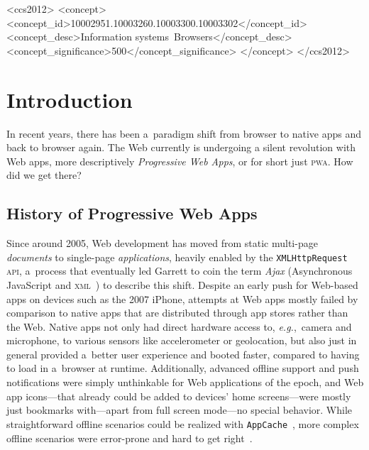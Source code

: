 \documentclass[sigconf,hyphens]{acmart}
\begin{document}
%
%
\begin{CCSXML}
<ccs2012>
<concept>
<concept_id>10002951.10003260.10003300.10003302</concept_id>
<concept_desc>Information systems~Browsers</concept_desc>
<concept_significance>500</concept_significance>
</concept>
</ccs2012>
\end{CCSXML}



\maketitle

\section{Introduction}

In recent years, there has been a~paradigm shift
from browser to native apps and back to browser again.
The Web currently is undergoing a silent revolution with Web apps,
more descriptively \emph{Progressive Web Apps},
or for short just \textsc{pwa}.
How did we get there?

\subsection{History of Progressive Web Apps}

Since around 2005, Web development has moved from static multi-page \emph{documents}
to single-page \emph{applications}, heavily enabled by the \texttt{XMLHttpRequest} \textsc{api},
a~process that eventually led Garrett to coin the term \emph{Ajax}
(Asynchronous JavaScript and \textsc{xml}~\cite{garret2005ajax}) to describe this shift.
Despite an early push for Web-based apps on devices such as the 2007 iPhone,
attempts at Web apps mostly failed by comparison to native apps
that are distributed through app stores rather than the Web.
Native apps not only had direct hardware access to, \emph{e.g.},\ camera and microphone,
to various sensors like accelerometer or geolocation, but also just in general provided
a~better user experience and booted faster, compared to having to load in a~browser at runtime.
Additionally, advanced offline support and push notifications were simply unthinkable
for Web applications of the epoch, and Web app icons---that
already could be added to devices' home screens---were
mostly just bookmarks with---apart from full screen mode---no special behavior.
While straightforward offline scenarios could be realized with
\texttt{AppCache}~\cite{vankesteren2008offlinewebapps}, more complex offline scenarios were error-prone
and hard to get right~\cite{archibald2012douchebag}.
\end{document}
